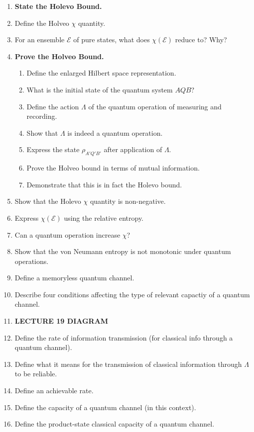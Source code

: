 \documentclass{article}
\newcommand{\mc}[1]{\mathcal{#1}}
\begin{document}
\begin{enumerate}
    \item \textbf{State the Holevo Bound.}
    \item Define the Holveo $\chi$ quantity.
    \item For an ensemble $\mc{E}$ of pure states, what does $\chi(\mc{E})$ reduce to? Why?
    \item \textbf{Prove the Holveo Bound.}
    \begin{enumerate}
        \item Define the enlarged Hilbert space representation.
        \item What is the initial state of the quantum system $AQB$?
        \item Define the action $\Lambda$ of the quantum operation of measuring and recording.
        \item Show that $\Lambda$ is indeed a quantum operation.
        \item Express the state $\rho_{A'Q'B'}$ after application of $\Lambda$.
        \item Prove the Holveo bound in terms of mutual information.
        \item Demonstrate that this is in fact the Holevo bound.
    \end{enumerate}
    \item Show that the Holevo $\chi$ quantity is non-negative.
    \item Express $\chi(\mc{E})$ using the relative entropy.
    \item Can a quantum operation increase $\chi$?
    \item Show that the von Neumann entropy is not monotonic under quantum operations.
    \item Define a memoryless quantum channel.
    \item Describe four conditions affecting the type of relevant capactiy of a quantum channel.
    \item \textbf{LECTURE 19 DIAGRAM}
    \item Define the rate of information transmission (for classical info through a quantum channel).
    \item Define what it means for the transmission of classical information through $\Lambda$ to be reliable.
    \item Define an achievable rate.
    \item Define the capacity of a quantum channel (in this context).
    \item Define the product-state classical capacity of a quantum channel.

\end{enumerate}
\end{document}
